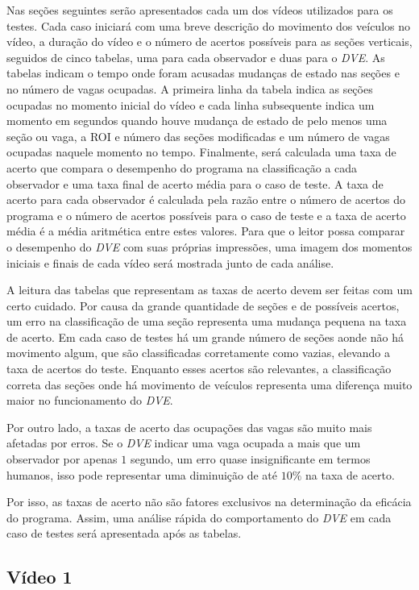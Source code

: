Nas seções seguintes serão apresentados cada um dos vídeos utilizados para os testes. Cada caso iniciará com uma breve descrição do movimento dos veículos no vídeo, a duração do vídeo e o número de acertos possíveis para as seções verticais, seguidos de cinco tabelas, uma para cada observador e duas para o \textit{DVE}. As tabelas indicam o tempo onde foram acusadas mudanças de estado nas seções e no número de vagas ocupadas. A primeira linha da tabela indica as seções ocupadas no momento inicial do vídeo e cada linha subsequente indica um momento em segundos quando houve mudança de estado de pelo menos uma seção ou vaga, a ROI e número das seções modificadas e um número de vagas ocupadas naquele momento no tempo.  Finalmente, será calculada uma taxa de acerto que compara o desempenho do programa na classificação a cada observador e uma taxa final de acerto média para o caso de teste. A taxa de acerto para cada observador é calculada pela razão entre o número de acertos do programa e o número de acertos possíveis para o caso de teste e a taxa de acerto média é a média aritmética entre estes valores. Para que o leitor possa comparar o desempenho do \textit{DVE} com suas próprias impressões, uma imagem dos momentos iniciais e finais de cada vídeo será mostrada junto de cada análise.

A leitura das tabelas que representam as taxas de acerto devem ser feitas com um certo cuidado. Por causa da grande quantidade de seções e de possíveis acertos, um erro na classificação de uma seção representa uma mudança pequena na taxa de acerto. Em cada caso de testes há um grande número de seções aonde não há movimento algum, que são classificadas corretamente como vazias, elevando a taxa de acertos do teste. Enquanto esses acertos são relevantes, a classificação correta das seções onde há movimento de veículos representa uma diferença muito maior no funcionamento do \textit{DVE}.

Por outro lado, a taxas de acerto das ocupações das vagas são muito mais afetadas por erros. Se o \textit{DVE} indicar uma vaga ocupada a mais que um observador por apenas $1$ segundo, um erro quase insignificante em termos humanos, isso pode representar uma diminuição de até $10\%$ na taxa de acerto. 

Por isso, as taxas de acerto não são fatores exclusivos na determinação da eficácia do programa. Assim, uma análise rápida do comportamento do \textit{DVE} em cada caso de testes será apresentada após as tabelas.

\subsection{Vídeo 1}

